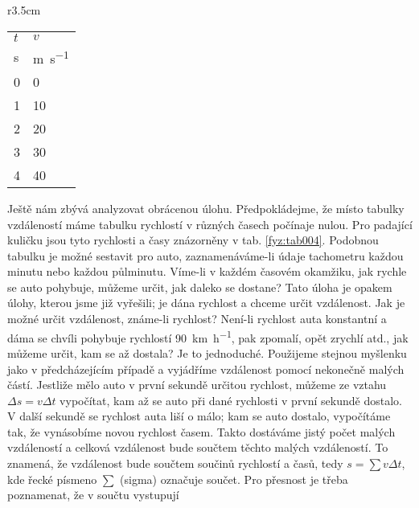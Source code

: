 {    \begin{wraptable}[13]{r}{3.5cm}      %
      \centering
      \begin{tabular}{>{\centering\arraybackslash}p{2em}|>{\centering\arraybackslash}p{3em}}
        \hline  \(t\)    & \(v\)          \\
                 \si{\s} & \si{\m\per\s}  \\
         \hline  \num{0} & \num{0}        \\
                 \num{1} & \num{10}       \\
                 \num{2} & \num{20}       \\
                 \num{3} & \num{30}       \\
                 \num{4} & \num{40}       \\
        \hline 
      \end{tabular}
      \caption{Rychlost padajícího tělesa (\cite[s.~115]{Feynman01})}
      \label{fyz:tab004}
    \end{wraptable}
    Ještě nám zbývá analyzovat obrácenou úlohu. Předpokládejme, že místo tabulky vzdáleností máme 
    tabulku rychlostí v různých časech počínaje nulou. Pro padající kuličku jsou tyto rychlosti a 
    časy znázorněny v tab. \ref{fyz:tab004}. Podobnou tabulku je možné sestavit pro auto, 
    zaznamenáváme-li údaje tachometru každou minutu nebo každou půlminutu. Víme-li v každém časovém 
    okamžiku, jak rychle se auto pohybuje, můžeme určit, jak daleko se dostane? Tato úloha je 
    opakem úlohy, kterou jsme již vyřešili; je dána rychlost a chceme určit vzdálenost. Jak je 
    možné určit vzdálenost, známe-li rychlost? Není-li rychlost auta konstantní a dáma se chvíli 
    pohybuje rychlostí \SI{90}{\km\per\hour}, pak zpomalí, opět zrychlí atd., jak můžeme určit, kam 
    se až dostala? Je to jednoduché. Použijeme stejnou myšlenku jako v předcházejícím případě a 
    vyjádříme vzdálenost pomocí nekonečně malých částí. Jestliže mělo auto v první sekundě určitou 
    rychlost, můžeme ze vztahu \(\Delta s = v\Delta t\) vypočítat, kam až se auto při dané 
    rychlosti v první sekundě dostalo. V další sekundě se rychlost auta liší o málo; kam se auto 
    dostalo, vypočítáme tak, že vynásobíme novou rychlost časem. Takto dostáváme jistý počet malých 
    vzdáleností a celková vzdálenost bude součtem těchto malých vzdáleností. To znamená, že 
    vzdálenost bude součtem součinů rychlostí a časů, tedy \(s=\sum v\Delta t\), kde řecké písmeno 
    \(\sum\) (sigma) označuje součet. Pro přesnost je třeba poznamenat, že v součtu vystupují 
}
